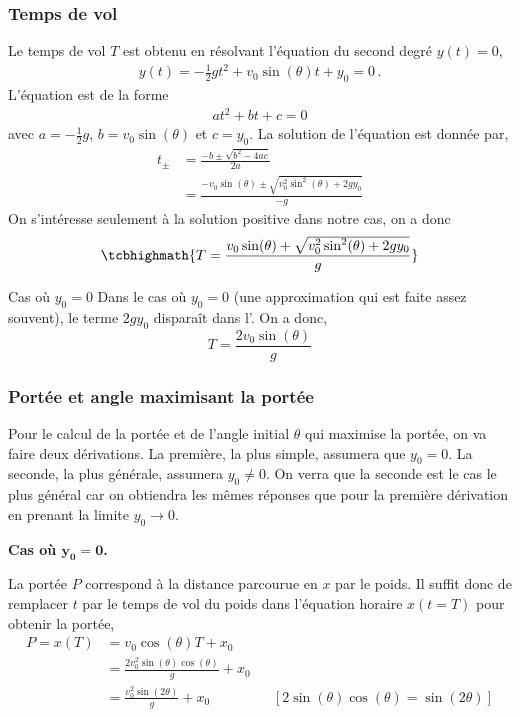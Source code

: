 \documentclass[titlepage]{article}
\theoremstyle{cleanremark}
\begin{document}
\subsubsection{Temps de vol}
Le temps de vol $T$ est obtenu en résolvant l'équation du second degré $y(t)=0$,
\begin{align}
    y(t)=-\frac{1}{2}g t^2 + v_0\sin(\theta) t + y_0 = 0\, .
\end{align} 
L'équation est de la forme 
\begin{align}
    at^2 + bt + c = 0
\end{align}
avec $a=-\frac{1}{2}g$, $b=v_0\sin(\theta)$ et $c=y_0$. La solution de l'équation est donnée par,
\begin{align}
    t_{\pm} &= \frac{-b \pm \sqrt{b^2 - 4ac}}{2 a}
    \\
    &= \frac{-v_0\sin(\theta) \pm \sqrt{v_0^2\sin^2(\theta) +2 g y_0}}{-g}
\end{align}
On s'intéresse seulement à la solution positive dans notre cas, on a donc 
\begin{align}\label{eq:flight_time_poids}
    \tcbhighmath{T= \frac{v_0\sin(\theta) + \sqrt{v_0^2\sin^2(\theta) + 2g y_0}}{g}}
\end{align}

\begin{note}{Cas où $y_0=0$}{}
    Dans le cas où $y_0=0$ (une approximation qui est faite assez souvent), le terme $2gy_0$ disparaît dans l'.
    On a donc, 
    \begin{equation}
    T = \frac{2 v_0\sin(\theta)}{g}
    \end{equation}
\end{note}

\subsubsection{Portée et angle maximisant la portée}
Pour le calcul de la portée et de l'angle initial $\theta$ qui maximise la portée, on va faire deux dérivations. La première, la plus simple, assumera que 
$y_0=0$. La seconde, la plus générale, assumera $y_0\neq 0$. On verra que la seconde est le cas le plus général car on obtiendra les mêmes réponses que pour la première
dérivation en prenant la limite $y_0\rightarrow 0$.


\noindent \textbf{Cas où $\mathbf{y_0=0}$.}

\noindent La portée $P$ correspond à la distance parcourue en $x$ par le poids. Il suffit donc de remplacer $t$ par le temps de vol du poids dans l'équation horaire $x(t=T)$ pour 
obtenir la portée,
\begin{align}
    P =x(T) &= v_0\cos(\theta) T + x_0
    \\
    &= \frac{2v_0^2 \sin(\theta)\cos(\theta)}{g} + x_0
    \\
    &= \frac{v_0^2\sin(2\theta)}{g} + x_0 &&[2\sin(\theta)\cos(\theta)=\sin(2\theta)]
\end{align}
\end{document}
